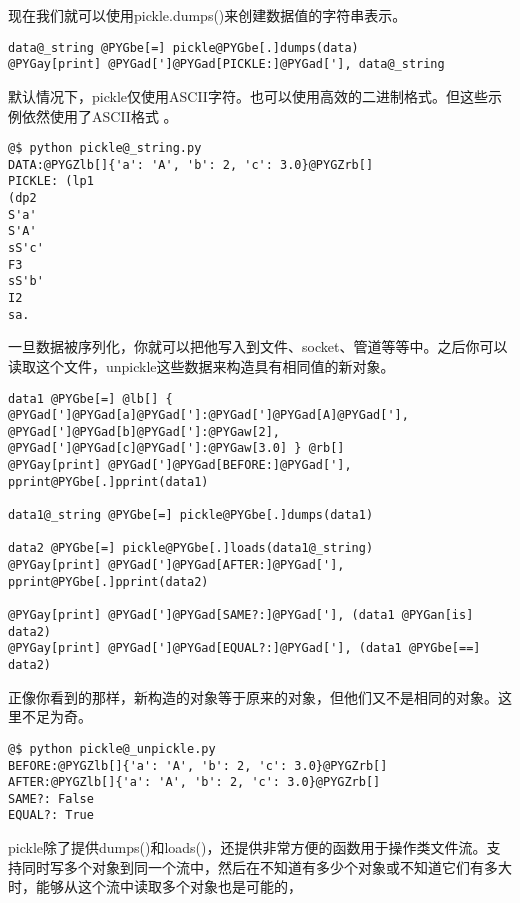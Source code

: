 \documentclass[a4paper,10pt,english]{manual}
\begin{document}
现在我们就可以使用pickle.dumps()来创建数据值的字符串表示。

\begin{Verbatim}[commandchars=@\[\]]
data@_string @PYGbe[=] pickle@PYGbe[.]dumps(data)
@PYGay[print] @PYGad[']@PYGad[PICKLE:]@PYGad['], data@_string
\end{Verbatim}

默认情况下，pickle仅使用ASCII字符。也可以使用高效的二进制格式。但这些示例依然使用了ASCII格式 。

\begin{Verbatim}[commandchars=@\[\]]
@$ python pickle@_string.py
DATA:@PYGZlb[]{'a': 'A', 'b': 2, 'c': 3.0}@PYGZrb[]
PICKLE: (lp1
(dp2
S'a'
S'A'
sS'c'
F3
sS'b'
I2
sa.
\end{Verbatim}

一旦数据被序列化，你就可以把他写入到文件、socket、管道等等中。之后你可以读取这个文件，unpickle这些数据来构造具有相同值的新对象。

\begin{Verbatim}[commandchars=@\[\]]
data1 @PYGbe[=] @lb[] { @PYGad[']@PYGad[a]@PYGad[']:@PYGad[']@PYGad[A]@PYGad['], @PYGad[']@PYGad[b]@PYGad[']:@PYGaw[2], @PYGad[']@PYGad[c]@PYGad[']:@PYGaw[3.0] } @rb[]
@PYGay[print] @PYGad[']@PYGad[BEFORE:]@PYGad['],
pprint@PYGbe[.]pprint(data1)

data1@_string @PYGbe[=] pickle@PYGbe[.]dumps(data1)

data2 @PYGbe[=] pickle@PYGbe[.]loads(data1@_string)
@PYGay[print] @PYGad[']@PYGad[AFTER:]@PYGad['],
pprint@PYGbe[.]pprint(data2)

@PYGay[print] @PYGad[']@PYGad[SAME?:]@PYGad['], (data1 @PYGan[is] data2)
@PYGay[print] @PYGad[']@PYGad[EQUAL?:]@PYGad['], (data1 @PYGbe[==] data2)
\end{Verbatim}

正像你看到的那样，新构造的对象等于原来的对象，但他们又不是相同的对象。这里不足为奇。

\begin{Verbatim}[commandchars=@\[\]]
@$ python pickle@_unpickle.py
BEFORE:@PYGZlb[]{'a': 'A', 'b': 2, 'c': 3.0}@PYGZrb[]
AFTER:@PYGZlb[]{'a': 'A', 'b': 2, 'c': 3.0}@PYGZrb[]
SAME?: False
EQUAL?: True
\end{Verbatim}

pickle除了提供dumps()和loads()，还提供非常方便的函数用于操作类文件流。支持同时写多个对象到同一个流中，然后在不知道有多少个对象或不知道它们有多大时，能够从这个流中读取多个对象也是可能的，
\end{document}
